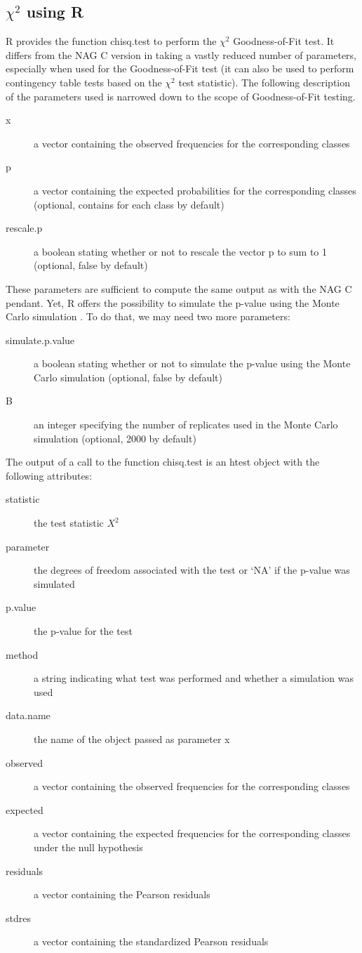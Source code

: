 \documentclass{article}
\theoremstyle{definition}
\begin{document}
\subsection{$\chi^2$ using R}
R provides the function chisq.test to perform the $\chi^2$ Goodness-of-Fit test.
It differs from the NAG C version in taking a vastly reduced number of parameters, especially when used for the Goodness-of-Fit test (it can also be used to perform contingency table tests based on the $\chi^2$ test statistic).
The following description of the parameters used is narrowed down to the scope of Goodness-of-Fit testing.
\begin{description}
	\item[x] a vector containing the observed frequencies for the corresponding classes
	\item[p] a vector containing the expected probabilities for the corresponding classes (optional, contains  for each class by default)
	\item[rescale.p] a boolean stating whether or not to rescale the vector p to sum to 1 (optional, false by default)
\end{description}
These parameters are sufficient to compute the same output as with the NAG C pendant.
Yet, R offers the possibility to simulate the p-value using the Monte Carlo simulation \cite{Rubinstein:2007:SMC:1349778}.
To do that, we may need two more parameters:
\begin{description}
	\item[simulate.p.value] a boolean stating whether or not to simulate the p-value using the Monte Carlo simulation (optional, false by default)
	\item[B] an integer specifying the number of replicates used in the Monte Carlo simulation (optional, 2000 by default)
\end{description}
The output of a call to the function chisq.test is an htest object with the following attributes:
\begin{description}
	\item[statistic] the test statistic $X^2$
	\item[parameter] the degrees of freedom associated with the test or `NA' if the p-value was simulated
	\item[p.value] the p-value for the test
	\item[method] a string indicating what test was performed and whether a simulation was used
	\item[data.name] the name of the object passed as parameter x
	\item[observed] a vector containing the observed frequencies for the corresponding classes
	\item[expected] a vector containing the expected frequencies for the corresponding classes under the null hypothesis
	\item[residuals] a vector containing the Pearson residuals
	\item[stdres] a vector containing the standardized Pearson residuals
\end{description}
\end{document}
